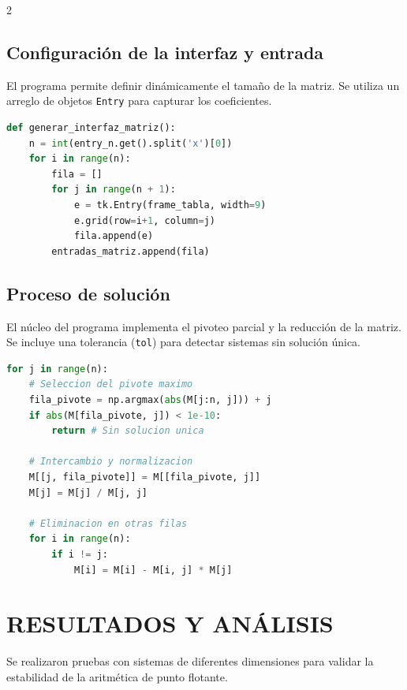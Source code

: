 \documentclass{rmf-d}
\begin{document}
\begin{multicols}{2}
\subsection{Configuración de la interfaz y entrada}
El programa permite definir dinámicamente el tamaño de la matriz. Se utiliza un arreglo de objetos \texttt{Entry} para capturar los coeficientes.
\begin{lstlisting}[language=Python, caption={Generación dinámica de la matriz de entrada.}]
def generar_interfaz_matriz():
    n = int(entry_n.get().split('x')[0])
    for i in range(n):
        fila = []
        for j in range(n + 1):
            e = tk.Entry(frame_tabla, width=9)
            e.grid(row=i+1, column=j)
            fila.append(e)
        entradas_matriz.append(fila)
\end{lstlisting}

\subsection{Proceso de solución}
El núcleo del programa implementa el pivoteo parcial y la reducción de la matriz. Se incluye una tolerancia (\texttt{tol}) para detectar sistemas sin solución única.

\begin{lstlisting}[language=Python, caption={Lógica de Gauss-Jordan con pivoteo parcial.}]
for j in range(n):
    # Seleccion del pivote maximo
    fila_pivote = np.argmax(abs(M[j:n, j])) + j
    if abs(M[fila_pivote, j]) < 1e-10:
        return # Sin solucion unica
    
    # Intercambio y normalizacion
    M[[j, fila_pivote]] = M[[fila_pivote, j]]
    M[j] = M[j] / M[j, j]
    
    # Eliminacion en otras filas
    for i in range(n):
        if i != j:
            M[i] = M[i] - M[i, j] * M[j]
\end{lstlisting}

\section{RESULTADOS Y ANÁLISIS}
\label{sec:4}
Se realizaron pruebas con sistemas de diferentes dimensiones para validar la estabilidad de la aritmética de punto flotante.


\end{multicols}
\end{document}
